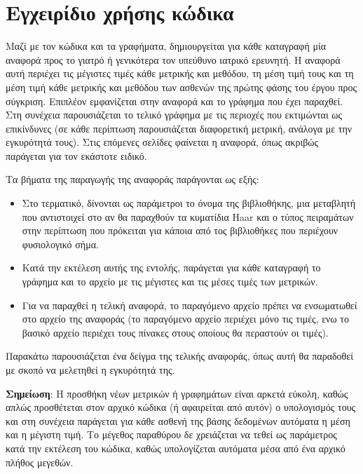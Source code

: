 \documentclass{article}
\newcommand \en {\selectlanguage{english}}
\newcommand \gr {\selectlanguage{greek}}
\begin{document}
\gr
\section{Εγχειρίδιο χρήσης κώδικα}
Μαζί με τον κώδικα και τα γραφήματα, δημιουργείται για κάθε καταγραφή μία αναφορά προς το γιατρό ή γενικότερα τον υπεύθυνο ιατρικό ερευνητή. Η αναφορά αυτή περιέχει τις μέγιστες τιμές κάθε μετρικής και μεθόδου, τη μέση τιμή τους και τη μέση τιμή κάθε μετρικής και μεθόδου των ασθενών της πρώτης φάσης του έργου προς
σύγκριση. Επιπλέον εμφανίζεται στην  αναφορά και το γράφημα που έχει παραχθεί. Στη συνέχεια παρουσιάζεται το τελικό γράφημα με τις περιοχές που εκτιμώνται ως επικίνδυνες (σε κάθε περίπτωση παρουσιάζεται διαφορετική μετρική, ανάλογα με την εγκυρότητά τους). Στις επόμενες σελίδες φαίνεται η αναφορά, όπως ακριβώς παράγεται για τον εκάστοτε ειδικό.
\par
Τα βήματα της παραγωγής της αναφοράς παράγονται ως εξής: 
\begin{itemize}
    \item Στο τερματικό, δίνονται ως παράμετροι το όνομα της βιβλιοθήκης, μια μεταβλητή που αντιστοιχεί στο αν θα παραχθούν τα κυματίδια \en Haar \gr και ο τύπος πειραμάτων στην περίπτωση που πρόκειται για κάποια από τος βιβλιοθήκες που περιέχουν φυσιολογικό σήμα.
    \item Κατά την εκτέλεση αυτής της εντολής, παράγεται για κάθε καταγραφή το γράφημα και το αρχείο με τις μέγιστες και τις μέσες τιμές των μετρικών.
    \item Για να παραχθεί η τελική αναφορά, το παραγόμενο αρχείο πρέπει να ενσωματωθεί στο αρχείο της αναφοράς (το παραγόμενο αρχείο περιέχει μόνο τις τιμές, ενω το βασικό αρχείο περιέχει τους πίνακες στους οποίους θα περαστούν οι τιμές).   
\end{itemize}
Παρακάτω παρουσιάζεται ένα δείγμα της τελικής αναφοράς, όπως αυτή θα παραδοθεί με σκοπό να μελετηθεί η εγκυρότητά της. 
\par
\textbf{Σημείωση}: Η προσθήκη νέων μετρικών ή γραφημάτων είναι αρκετά εύκολη, καθώς απλώς προσθέτεται στον αρχικό κώδικα (ή αφαιρείται από αυτόν) ο υπολογισμός τους και στη συνέχεια παράγεται για κάθε ασθενή της βάσης δεδομένων αυτόματα η μέση και η μέγιστη τιμή. Το μέγεθος παραθύρου δε χρειάζεται να τεθεί ως παράμετρος κατά την εκτέλεση του κώδικα, καθώς υπολογίζεται αυτόματα μέσα από ένα αρχικό πλήθος μεγεθών. 


\end{document}
